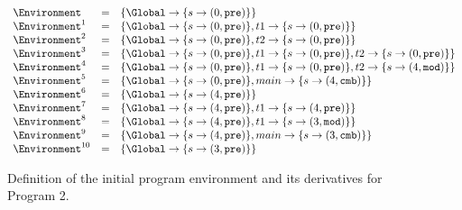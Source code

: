 \begin{figure}
	\centering
	$$\begin{array}{l l l}
		\Environment		&=& \left \lbrace
									\Global \to \lbrace s \to (0, \mathtt{pre}) \rbrace
								\right \rbrace		\\
		\Environment^1		&=& \left \lbrace
									\Global \to \lbrace s \to (0, \mathtt{pre}) \rbrace,
									t1 \to \lbrace s \to (0, \mathtt{pre}) \rbrace
								\right \rbrace		\\
		\Environment^2		&=& \left \lbrace
									\Global \to \lbrace s \to (0, \mathtt{pre}) \rbrace,
									t2 \to \lbrace s \to (0, \mathtt{pre}) \rbrace
								\right \rbrace		\\
		\Environment^3		&=& \left \lbrace
									\Global \to \lbrace s \to (0, \mathtt{pre}) \rbrace,
									t1 \to \lbrace s \to (0, \mathtt{pre}) \rbrace,
									t2 \to \lbrace s \to (0, \mathtt{pre}) \rbrace
								\right \rbrace		\\
		\Environment^4		&=& \left \lbrace
									\Global \to \lbrace s \to (0, \mathtt{pre}) \rbrace,
									t1 \to \lbrace s \to (0, \mathtt{pre}) \rbrace,
									t2 \to \lbrace s \to (4, \mathtt{mod}) \rbrace
								\right \rbrace		\\
		\Environment^5		&=& \left \lbrace
									\Global \to \lbrace s \to (0, \mathtt{pre}) \rbrace,
									main \to \lbrace s \to (4, \mathtt{cmb}) \rbrace
								\right \rbrace		\\
		\Environment^6		&=& \left \lbrace
									\Global \to \lbrace s \to (4, \mathtt{pre}) \rbrace
								\right \rbrace		\\
		\Environment^7		&=& \left \lbrace
									\Global \to \lbrace s \to (4, \mathtt{pre}) \rbrace,
									t1 \to \lbrace s \to (4, \mathtt{pre}) \rbrace
								\right \rbrace		\\
		\Environment^8		&=& \left \lbrace
									\Global \to \lbrace s \to (4, \mathtt{pre}) \rbrace,
									t1 \to \lbrace s \to (3, \mathtt{mod}) \rbrace
								\right \rbrace		\\
		\Environment^9		&=& \left \lbrace
									\Global \to \lbrace s \to (4, \mathtt{pre}) \rbrace,
									main \to \lbrace s \to (3, \mathtt{cmb}) \rbrace
								\right \rbrace		\\
		\Environment^{10}	&=& \left \lbrace
									\Global \to \lbrace s \to (3, \mathtt{pre}) \rbrace
								\right \rbrace		\\
	\end{array}$$
	
	\caption{Definition of the initial program environment and its derivatives for Program 2.}
	\label{figure:forec_program_2}
\end{figure}

